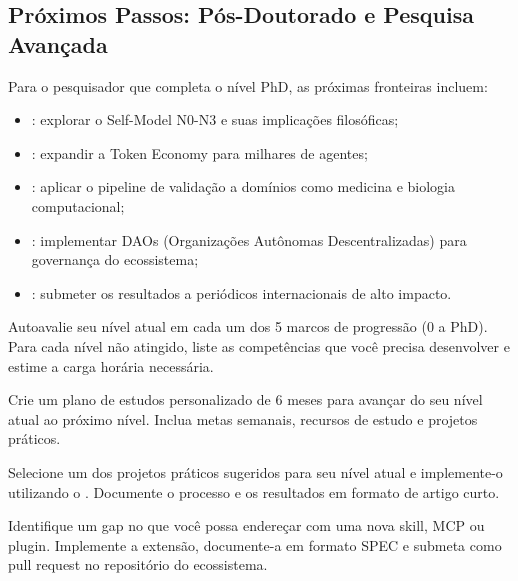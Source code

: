 \subsection{Próximos Passos: Pós-Doutorado e Pesquisa Avançada}

Para o pesquisador que completa o nível PhD, as próximas fronteiras incluem:

\begin{itemize}
\item {}: explorar o Self-Model
      N0-N3 e suas implicações filosóficas;
\item {}: expandir a Token Economy
      para milhares de agentes;
\item {}: aplicar o pipeline de validação a domínios
      como medicina e biologia computacional;
\item {}: implementar DAOs (Organizações
      Autônomas Descentralizadas) para governança do ecossistema;
\item {}: submeter os resultados a periódicos
      internacionais de alto impacto.
\end{itemize}

\begin{exercicio}
    Autoavalie seu nível atual em cada um dos 5 marcos de progressão
    (0 a PhD). Para cada nível não atingido, liste as competências que
    você precisa desenvolver e estime a carga horária necessária.
\end{exercicio}

\begin{exercicio}
    Crie um plano de estudos personalizado de 6 meses para avançar do seu
    nível atual ao próximo nível. Inclua metas semanais, recursos de estudo
    e projetos práticos.
\end{exercicio}

\begin{exercicio}
    Selecione um dos projetos práticos sugeridos para seu nível atual e
    implemente-o utilizando o \opencodeeco{}. Documente o processo e os
    resultados em formato de artigo curto.
\end{exercicio}

\begin{exercicio}
    Identifique um gap no \opencodeeco{} que você possa endereçar com uma
    nova skill, MCP ou plugin. Implemente a extensão, documente-a em formato
    SPEC e submeta como pull request no repositório do ecossistema.
\end{exercicio}

